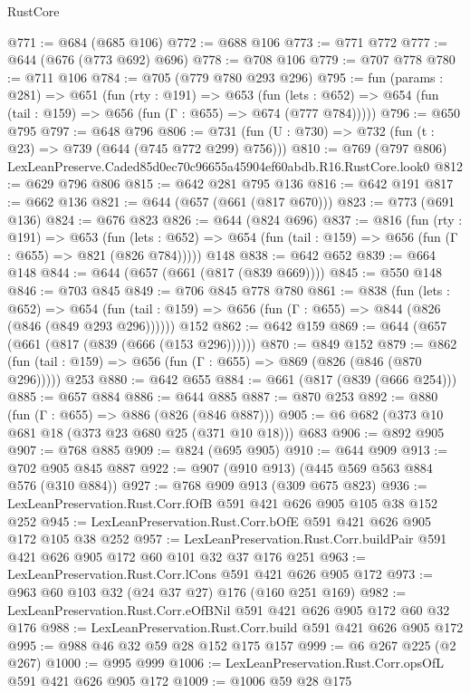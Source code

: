\begin{lexlean}{RustCore}
\begin{coremodule}
@771 := @684 (@685 @106)
@772 := @688 @106
@773 := @771 @772
@777 := @644 (@676 (@773 @692) @696)
@778 := @708 @106
@779 := @707 @778
@780 := @711 @106
@784 := @705 (@779 @780 @293 @296)
@795 := fun (params : @281) =>
  @651
    (fun (rty : @191) =>
    @653
      (fun (lets : @652) => @654 (fun (tail : @159) => @656 (fun (Γ : @655) => @674 (@777 @784)))))
@796 := @650 @795
@797 := @648 @796
@806 := @731 (fun (U : @730) => @732 (fun (t : @23) => @739 (@644 (@745 @772 @299) @756)))
@810 := @769 (@797 @806) LexLeanPreserve.Caded85d0ec70c96655a45904ef60abdb.R16.RustCore.look0
@812 := @629 @796 @806
@815 := @642 @281 @795 @136
@816 := @642 @191
@817 := @662 @136
@821 := @644 (@657 (@661 (@817 @670)))
@823 := @773 (@691 @136)
@824 := @676 @823
@826 := @644 (@824 @696)
@837 := @816
    (fun (rty : @191) =>
    @653
      (fun (lets : @652) => @654 (fun (tail : @159) => @656 (fun (Γ : @655) => @821 (@826 @784)))))
    @148
@838 := @642 @652
@839 := @664 @148
@844 := @644 (@657 (@661 (@817 (@839 @669))))
@845 := @550 @148
@846 := @703 @845
@849 := @706 @845 @778 @780
@861 := @838
    (fun (lets : @652) =>
    @654 (fun (tail : @159) => @656 (fun (Γ : @655) => @844 (@826 (@846 (@849 @293 @296))))))
    @152
@862 := @642 @159
@869 := @644 (@657 (@661 (@817 (@839 (@666 (@153 @296))))))
@870 := @849 @152
@879 := @862 (fun (tail : @159) => @656 (fun (Γ : @655) => @869 (@826 (@846 (@870 @296))))) @253
@880 := @642 @655
@884 := @661 (@817 (@839 (@666 @254)))
@885 := @657 @884
@886 := @644 @885
@887 := @870 @253
@892 := @880 (fun (Γ : @655) => @886 (@826 (@846 @887)))
@905 := @6 @682 (@373 @10 @681 @18 (@373 @23 @680 @25 (@371 @10 @18))) @683
@906 := @892 @905
@907 := @768 @885
@909 := @824 (@695 @905)
@910 := @644 @909
@913 := @702 @905 @845 @887
@922 := @907 (@910 @913) (@445 @569 @563 @884 @576 (@310 @884))
@927 := @768 @909 @913 (@309 @675 @823)
@936 := LexLeanPreservation.Rust.Corr.fOfB @591 @421 @626 @905 @105 @38 @152 @252
@945 := LexLeanPreservation.Rust.Corr.bOfE @591 @421 @626 @905 @172 @105 @38 @252
@957 := LexLeanPreservation.Rust.Corr.buildPair @591 @421 @626 @905 @172 @60 @101 @32 @37 @176 @251
@963 := LexLeanPreservation.Rust.Corr.lCons @591 @421 @626 @905 @172
@973 := @963 @60 @103 @32 (@24 @37 @27) @176 (@160 @251 @169)
@982 := LexLeanPreservation.Rust.Corr.eOfBNil @591 @421 @626 @905 @172 @60 @32 @176
@988 := LexLeanPreservation.Rust.Corr.build @591 @421 @626 @905 @172
@995 := @988 @46 @32 @59 @28 @152 @175 @157
@999 := @6 @267 @225 (@2 @267)
@1000 := @995 @999
@1006 := LexLeanPreservation.Rust.Corr.opsOfL @591 @421 @626 @905 @172
@1009 := @1006 @59 @28 @175

\end{coremodule}
\end{lexlean}
